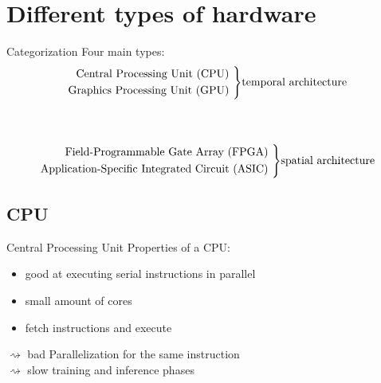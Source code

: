 \documentclass[en]{sdqbeamer}
\newenvironment{rcases}
{\left.\begin{aligned}}
{\end{aligned}\right\rbrace}
\begin{document}
\section{Different types of hardware}
\begin{frame}{Categorization}
Four main types:
\\
		\[
		\begin{rcases}
			\text{Central Processing Unit (CPU) } \\
			\text{Graphics Processing Unit (GPU) } 
		\end{rcases} \text{temporal architecture}
		\]
		\\
		\quad
		\\
		\[
		\begin{rcases}
			\text{Field-Programmable Gate Array (FPGA) } \\
			\text{Application-Specific Integrated Circuit (ASIC) }
		\end{rcases} \text{spatial architecture}
		\]
\end{frame}

\subsection{CPU}
\begin{frame}{Central Processing Unit}
	Properties of a CPU:
	\begin{itemize}
		\item good at executing serial instructions in parallel
		\item small amount of cores
		\item fetch instructions and execute
	\end{itemize}
	$\rightsquigarrow$ bad Parallelization for the same instruction\\ $\rightsquigarrow$ slow training and inference phases
\end{frame}
\end{document}

